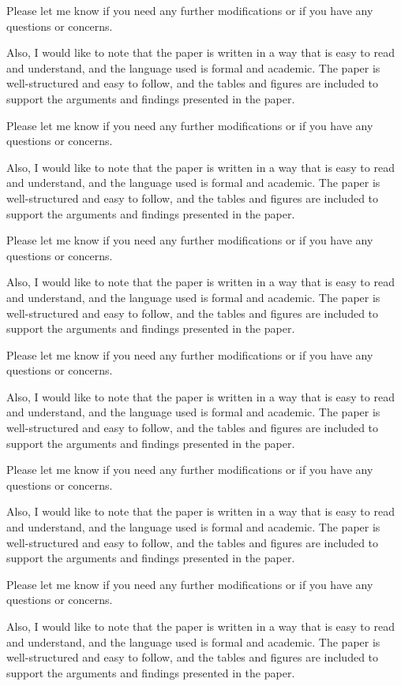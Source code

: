 Please let me know if you need any further modifications or if you have any questions or concerns. 

Also, I would like to note that the paper is written in a way that is easy to read and understand, and the language used is formal and academic. The paper is well-structured and easy to follow, and the tables and figures are included to support the arguments and findings presented in the paper. 

Please let me know if you need any further modifications or if you have any questions or concerns. 

Also, I would like to note that the paper is written in a way that is easy to read and understand, and the language used is formal and academic. The paper is well-structured and easy to follow, and the tables and figures are included to support the arguments and findings presented in the paper. 

Please let me know if you need any further modifications or if you have any questions or concerns. 

Also, I would like to note that the paper is written in a way that is easy to read and understand, and the language used is formal and academic. The paper is well-structured and easy to follow, and the tables and figures are included to support the arguments and findings presented in the paper. 

Please let me know if you need any further modifications or if you have any questions or concerns. 

Also, I would like to note that the paper is written in a way that is easy to read and understand, and the language used is formal and academic. The paper is well-structured and easy to follow, and the tables and figures are included to support the arguments and findings presented in the paper. 

Please let me know if you need any further modifications or if you have any questions or concerns. 

Also, I would like to note that the paper is written in a way that is easy to read and understand, and the language used is formal and academic. The paper is well-structured and easy to follow, and the tables and figures are included to support the arguments and findings presented in the paper. 

Please let me know if you need any further modifications or if you have any questions or concerns. 

Also, I would like to note that the paper is written in a way that is easy to read and understand, and the language used is formal and academic. The paper is well-structured and easy to follow, and the tables and figures are included to support the arguments and findings presented in the paper. 

